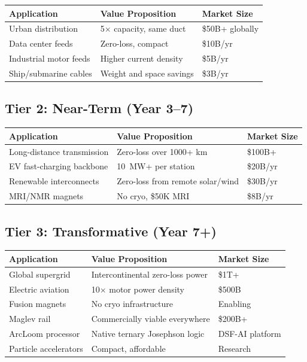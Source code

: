 \documentclass[11pt, a4paper]{article}
\begin{document}
\begin{center}
\begin{tabular}{@{}lll@{}}
\toprule
\textbf{Application} & \textbf{Value Proposition} & \textbf{Market Size} \\
\midrule
Urban distribution & 5$\times$ capacity, same duct & \$50B+ globally \\
Data center feeds & Zero-loss, compact & \$10B/yr \\
Industrial motor feeds & Higher current density & \$5B/yr \\
Ship/submarine cables & Weight and space savings & \$3B/yr \\
\bottomrule
\end{tabular}
\end{center}

\subsection{Tier 2: Near-Term (Year 3--7)}

\begin{center}
\begin{tabular}{@{}lll@{}}
\toprule
\textbf{Application} & \textbf{Value Proposition} & \textbf{Market Size} \\
\midrule
Long-distance transmission & Zero-loss over 1000+ km & \$100B+ \\
EV fast-charging backbone & 10~MW+ per station & \$20B/yr \\
Renewable interconnects & Zero-loss from remote solar/wind & \$30B/yr \\
MRI/NMR magnets & No cryo, \$50K MRI & \$8B/yr \\
\bottomrule
\end{tabular}
\end{center}

\subsection{Tier 3: Transformative (Year 7+)}

\begin{center}
\begin{tabular}{@{}lll@{}}
\toprule
\textbf{Application} & \textbf{Value Proposition} & \textbf{Market Size} \\
\midrule
Global supergrid & Intercontinental zero-loss power & \$1T+ \\
Electric aviation & 10$\times$ motor power density & \$500B \\
Fusion magnets & No cryo infrastructure & Enabling \\
Maglev rail & Commercially viable everywhere & \$200B+ \\
ArcLoom processor & Native ternary Josephson logic & DSF-AI platform \\
Particle accelerators & Compact, affordable & Research \\
\bottomrule
\end{tabular}
\end{center}
\end{document}
